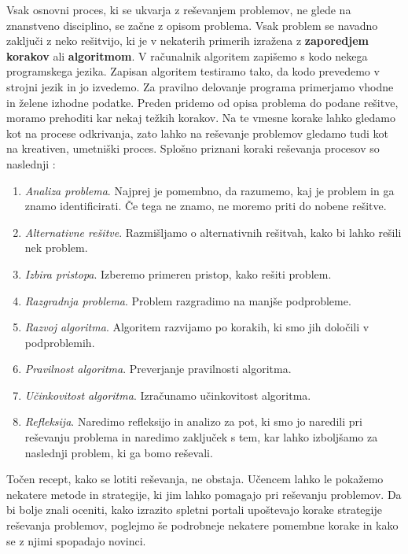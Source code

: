 
Vsak osnovni proces, ki se ukvarja z reševanjem problemov, ne glede na
znanstveno disciplino, se začne z opisom problema. Vsak problem se
navadno zaključi z neko rešitvijo, ki je v nekaterih primerih izražena
z \textbf{zaporedjem korakov} ali \textbf{algoritmom}. V računalnik
algoritem zapišemo s kodo nekega programskega jezika. Zapisan
algoritem testiramo tako, da kodo prevedemo v strojni jezik in jo
izvedemo. Za pravilno delovanje programa primerjamo vhodne in želene
izhodne podatke. Preden pridemo od opisa problema do podane rešitve,
moramo prehoditi kar nekaj težkih korakov. Na te vmesne korake lahko
gledamo kot na procese odkrivanja, zato lahko na reševanje problemov
gledamo tudi kot na kreativen, umetniški proces. Splošno priznani
koraki reševanja procesov so naslednji \cite{guideTCS}:

\begin{enumerate}
\tightlist
\item \emph{Analiza problema}. Najprej je pomembno, da razumemo, kaj je
  problem in ga znamo identificirati. Če tega ne znamo, ne moremo
  priti do nobene rešitve.
\item \emph{Alternativne rešitve}. Razmišljamo o alternativnih
  rešitvah, kako bi lahko rešili nek problem.
\item \emph{Izbira pristopa}. Izberemo primeren pristop, kako rešiti problem.
\item \emph{Razgradnja problema}. Problem razgradimo na manjše podprobleme.
\item \emph{Razvoj algoritma}. Algoritem razvijamo po korakih, ki smo
  jih določili v podproblemih.
\item \emph{Pravilnost algoritma}. Preverjanje pravilnosti algoritma.
\item \emph{Učinkovitost algoritma}. Izračunamo učinkovitost algoritma.
\item \emph{Refleksija}. Naredimo refleksijo in analizo za pot, ki smo
  jo naredili pri reševanju problema in naredimo zaključek s tem, kar
  lahko izboljšamo za naslednji problem, ki ga bomo reševali.
\end{enumerate}

Točen recept, kako se lotiti reševanja, ne obstaja. Učencem lahko le
pokažemo nekatere metode in strategije, ki jim lahko pomagajo pri
reševanju problemov. Da bi bolje znali oceniti, kako izrazito spletni
portali upoštevajo korake strategije reševanja problemov, poglejmo še podrobneje nekatere pomembne korake in kako se z njimi spopadajo
novinci.

